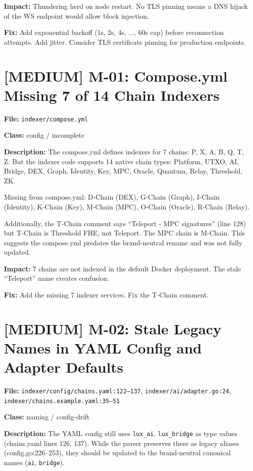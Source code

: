 \documentclass{article}
\begin{document}
\textbf{Impact:} Thundering herd on node restart. No TLS pinning means a
DNS hijack of the WS endpoint would allow block injection.

\textbf{Fix:} Add exponential backoff (1s, 2s, 4s, ..., 60s cap) before
reconnection attempts. Add jitter. Consider TLS certificate pinning for
production endpoints.


\section{[MEDIUM] M-01: Compose.yml Missing 7 of 14 Chain Indexers}

\textbf{File:} \texttt{indexer/compose.yml}

\textbf{Class:} config / incomplete

\textbf{Description:}
The compose.yml defines indexers for 7 chains: P, X, A, B, Q, T, Z.
But the indexer code supports 14 native chain types:
Platform, UTXO, AI, Bridge, DEX, Graph, Identity, Key, MPC, Oracle,
Quantum, Relay, Threshold, ZK.

Missing from compose.yml: D-Chain (DEX), G-Chain (Graph), I-Chain (Identity),
K-Chain (Key), M-Chain (MPC), O-Chain (Oracle), R-Chain (Relay).

Additionally, the T-Chain comment says ``Teleport - MPC signatures'' (line 128)
but T-Chain is Threshold FHE, not Teleport. The MPC chain is M-Chain.
This suggests the compose.yml predates the brand-neutral rename and was
not fully updated.

\textbf{Impact:} 7 chains are not indexed in the default Docker deployment.
The stale ``Teleport'' name creates confusion.

\textbf{Fix:} Add the missing 7 indexer services. Fix the T-Chain comment.


\section{[MEDIUM] M-02: Stale Legacy Names in YAML Config and Adapter Defaults}

\textbf{File:} \texttt{indexer/config/chains.yaml:122--137},
\texttt{indexer/ai/adapter.go:24},
\texttt{indexer/chains.example.yaml:35--51}

\textbf{Class:} naming / config-drift

\textbf{Description:}
The YAML config still uses \texttt{lux\_ai}, \texttt{lux\_bridge} as type values
(chains.yaml lines 126, 137). While the parser preserves these as legacy aliases
(config.go:226--253), they should be updated to the brand-neutral canonical names
(\texttt{ai}, \texttt{bridge}).
\end{document}
